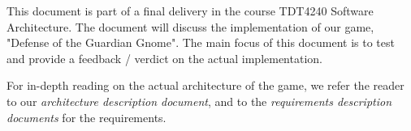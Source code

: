 This document is part of a final delivery in the course TDT4240 Software Architecture. The document will discuss the implementation of our game, "Defense of the Guardian Gnome". The main focus of this document is to test and provide a feedback / verdict on the actual implementation. 

For in-depth reading on the actual architecture of the game, we refer the reader to our \emph{architecture description document}, and to the \emph{requirements description documents} for the requirements. 

